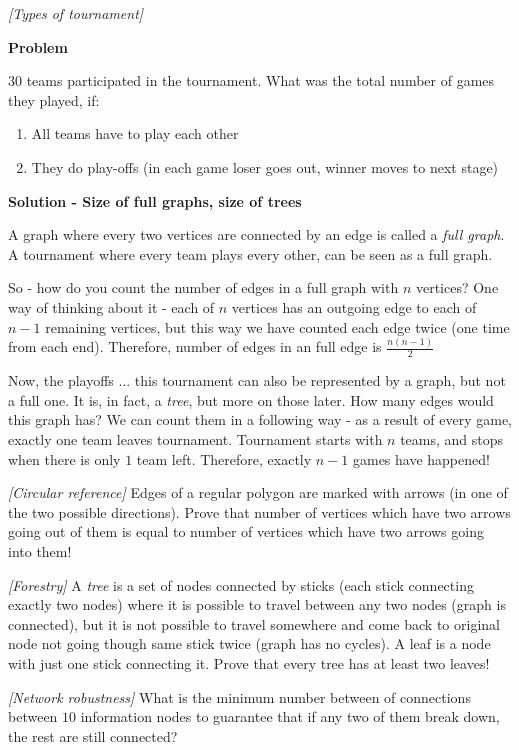 \begin{problem}
\textit{[Types of tournament]}

\textbf{Problem}

30 teams participated in the tournament. What was the total number of games they played, if:
\begin{enumerate}
\item All teams have to play each other
\item They do play-offs (in each game loser goes out, winner moves to next stage)
\end{enumerate}

\textbf{Solution - Size of full graphs, size of trees}

A graph where every two vertices are connected by an edge is called a \textit{full graph}. A tournament where  every team plays every other, can be seen as a full graph. 

So - how do you count the number of edges in a full graph with $n$ vertices? One way of thinking about it - each of $n$ vertices has an outgoing edge to each of $n-1$ remaining vertices, but this way we have counted each edge twice (one time from each end). Therefore, number of edges in an full edge is $\frac{n(n-1)}{2}$ 

Now, the playoffs ... this tournament can also be represented by a graph, but not a full one. It is, in fact, a \textit{tree}, but more on those later. How many edges would this graph has? We can count them in a following way - as a result of every game, exactly one team leaves tournament. Tournament starts with $n$ teams, and stops when there is only $1$ team left. Therefore, exactly $n-1$ games have happened!
\end{problem}
%

\begin{problem}
\textit{[Circular reference]}
Edges of a regular polygon are marked with arrows (in one of the two possible directions). Prove that number of vertices which have two arrows going out of them is equal to number of vertices which have two arrows going into them!
\end{problem}
%

\begin{problem}
\textit{[Forestry]}
A \textit{tree} is a set of nodes connected by sticks (each stick connecting exactly two nodes) where it is possible to travel between any two nodes (graph is connected), but it is not possible to travel somewhere and come back to original node not going though same stick twice (graph has no cycles).  A leaf is a node with just one stick connecting it. Prove that every tree has at least two leaves!
\end{problem}
%

\begin{problem}
\textit{[Network robustness]}
What is the minimum number between of connections between $10$ information nodes to guarantee that if any two of them break down, the rest are still connected? 
\end{problem}
%
\filbreak



